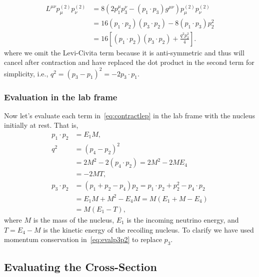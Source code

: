 \begin{align}
L^{\mu \nu}p_{\mu}^{(2)}p_{\nu}^{(2)} &= 8(2p_1^{\mu}p_3^{\nu}-(p_1\cdot p_3)g^{\mu \nu})p_{\mu}^{(2)}p_{\nu}^{(2)} \nonumber \\
&= 16(p_1\cdot p_2)(p_3\cdot p_2)-8(p_1\cdot p_3)p_2^2 \nonumber \\
&= 16\left[ (p_1\cdot p_2)(p_3\cdot p_2)+\frac{q^2p_2^2}{4}\right]. \label{eq:contractlep}
\end{align}
where we omit the Levi-Civita term because it is anti-symmetric and thus will cancel after contraction and have replaced the dot product in the second term for simplicity, i.e., $q^2=(p_3-p_1)^2=-2p_3\cdot p_1$.

\subsubsection{Evaluation in the lab frame}
Now let's evaluate each term in~\eqref{eq:contractlep} in the lab frame with the nucleus initially at rest. That is,
\begin{align}\label{eq:evalp1p2}
p_1\cdot p_2 &= E_1M, 
\\
q^2 &=(p_4-p_2)^2 \nonumber \\
&= 2M^2-2(p_4\cdot p_2)=2M^2-2ME_4 \nonumber \\
&=-2MT, \label{eq:evalq}
\\
p_3\cdot p_2 &= (p_1+p_2-p_4)p_2= p_1\cdot p_2 +p_2^2 - p_4\cdot p_2 \nonumber \\ 
&= E_1M+M^2-E_4M = M(E_1+M-E_4)\nonumber \\
&=M(E_1-T),\label{eq:evalp3p2} 
\end{align}
where $M$ is the mass of the nucleus, $E_1$ is the incoming neutrino energy, and $T=E_4-M$ is the kinetic energy of the recoiling nucleus. To clarify we have used momentum conservation in~\eqref{eq:evalp3p2} to replace $p_3$. 

\subsection{Evaluating the Cross-Section}

